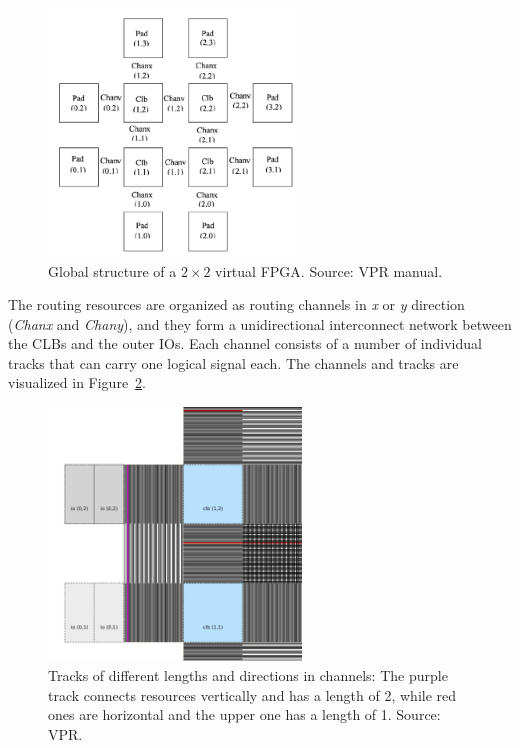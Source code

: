 \documentclass{article}
\begin{document}
\begin{figure}[htp]
    \centering
    \includegraphics[width=0.6\textwidth]{Figures/structure.pdf}
    \caption{Global structure of a \(2 \times 2\) virtual FPGA. Source: VPR manual.}
    \label{fig:global_zuma_structure}
\end{figure}

\newpage
The routing resources are organized as routing channels in \emph{x} or \emph{y} direction (\emph{Chanx} and \emph{Chany}), and they form a unidirectional interconnect network between the CLBs and the outer IOs.
Each channel consists of a number of individual tracks that can carry one logical signal each.
The channels and tracks are visualized in Figure~\ref{fig:channels}.

\begin{figure}[htpb]
    \centering
    \includegraphics[width=0.6\textwidth]{Figures/channels.pdf}
    \caption{Tracks of different lengths and directions in channels: The purple track connects resources vertically and has a length of 2, while red ones are horizontal and the upper one has a length of 1. Source: VPR.}
    \label{fig:channels}
\end{figure}
\end{document}
